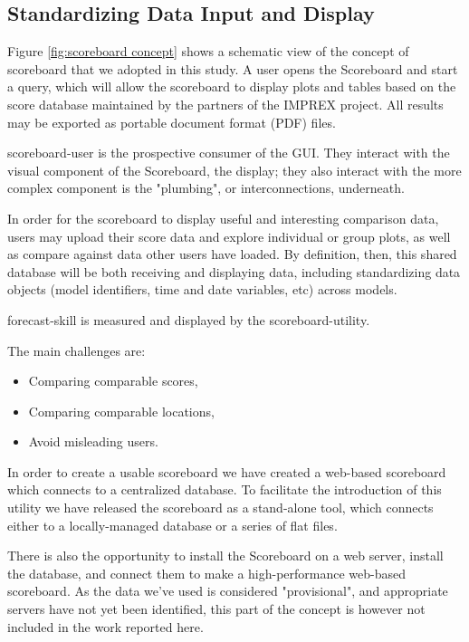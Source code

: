\documentclass[logos,parttoc,morelanguage=french,morelanguage=german]{orsay-memoire}
\begin{document}
\subsection{Standardizing Data Input and Display}

Figure \ref{fig:scoreboard concept} shows a schematic view of the concept of scoreboard that we adopted in this study. A user opens the Scoreboard and start a query, which will allow the scoreboard to display plots and tables based on the score database maintained by the partners of the IMPREX project. All results may be exported as portable document format (PDF) files.

\gls{scoreboard-user} is the prospective consumer of the GUI. They interact with the visual component of the Scoreboard, the display; they also interact with the more complex component is the "plumbing", or interconnections, underneath.

In order for the scoreboard to display useful and interesting comparison data, users may upload their score data and explore individual or group plots, as well as compare against data other users have loaded. By definition, then, this shared database will be both receiving and displaying data, including standardizing data objects (model identifiers, time and date variables, etc) across models.

\gls{forecast-skill} is measured and displayed by the \gls{scoreboard-utility}.

The main challenges are:
\begin{itemize}
	\item Comparing comparable scores,
	\item Comparing comparable locations,
	\item Avoid misleading users.
\end{itemize}

In order to create a usable scoreboard we have created a web-based scoreboard which connects to a centralized database. To facilitate the introduction of this utility we have released the scoreboard as a stand-alone tool, which connects either to a locally-managed database or a series of flat files.

There is also the opportunity to install the Scoreboard on a web server, install the database, and connect them to make a high-performance web-based scoreboard. As the data we've used is considered "provisional", and appropriate servers have not yet been identified, this part of the concept is however not included in the work reported here.
\end{document}
